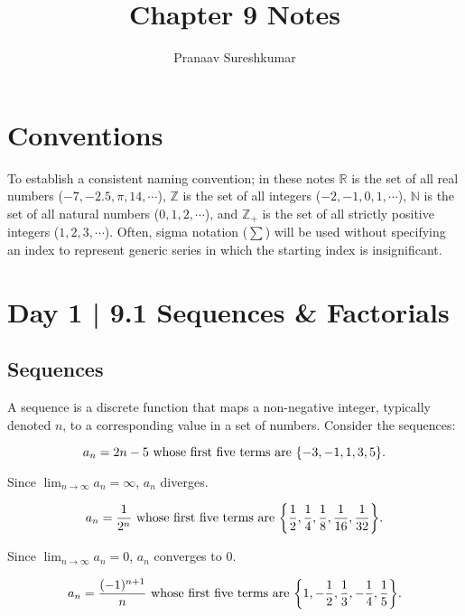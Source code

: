 \documentclass[10pt]{article}
\title{Chapter 9 Notes}
\author{Pranaav Sureshkumar}
\theoremstyle{definition}
\DeclarePairedDelimiter{\curly}{\{}{\}}
\begin{document}
\maketitle

\tableofcontents

\section*{Conventions}
To establish a consistent naming convention; in these notes $\mathbb{R}$ is the set of all real numbers ($-7, -2.5, \pi, 14,\cdots$), $\mathbb{Z}$ is the set of all integers ($-2,-1,0,1,\cdots$), $\mathbb{N}$ is the set of all natural numbers ($0,1,2,\cdots$), and $\mathbb{Z_+}$ is the set of all strictly positive integers ($1,2,3,\cdots$). Often, sigma notation ($\sum$) will be used without specifying an index to represent generic series in which the starting index is insignificant.


\section{Day 1 | 9.1 Sequences \& Factorials}

\vspace{0.5cm}

\subsection{Sequences}
A sequence is a discrete function that maps a non-negative integer, typically denoted $n$, to a corresponding value in a set of numbers.
Consider the sequences:



\[a_n  = 2n-5 \text{ whose first five terms are } \curly*{-3, -1, 1, 3, 5}.\]
\begin{center}
    Since $\displaystyle\lim_{n \to \infty} a_n =\infty$, $a_n$ diverges.
\end{center}

\[a_n  = \frac{1}{2^n} \text{ whose first five terms are } \curly*{\frac{1}{2}, \frac{1}{4}, \frac{1}{8}, \frac{1}{16}, \frac{1}{32}}.\]

\begin{center}
    Since $\displaystyle\lim_{n \to \infty} a_n = 0$, $a_n$ converges to 0.
\end{center}

\[a_n  = \frac{(-1)^{n+1}}{n} \text{ whose first five terms are } \curly*{1, -\frac{1}{2}, \frac{1}{3}, -\frac{1}{4}, \frac{1}{5}}.\]
\end{document}
